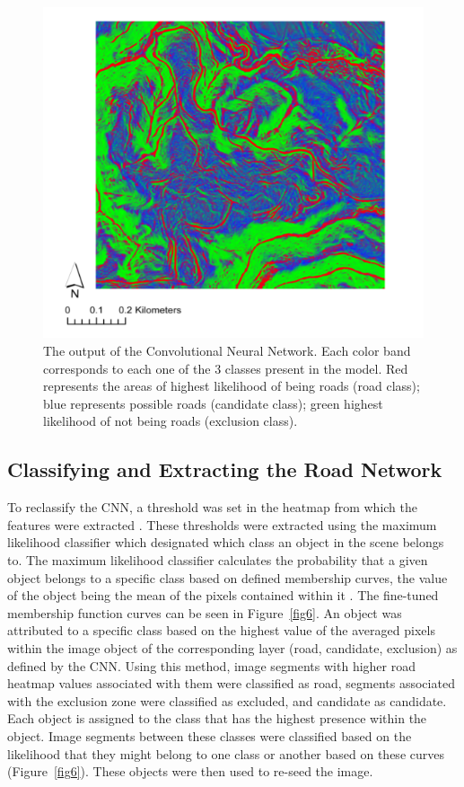 \documentclass[remotesensing,article,submit,pdftex,moreauthors]{Definitions/mdpi}
\begin{document}
\begin{figure}[H]
\includegraphics[width=10.5 cm]{cnn.png}
\caption{The output of the Convolutional Neural Network. Each color band corresponds to each one of the 3 classes present in the model. Red represents the areas of highest likelihood of being roads (road class); blue represents possible roads (candidate class); green highest likelihood of not being roads (exclusion class). \label{fig5}}
\end{figure}  

\subsection{Classifying and Extracting the Road Network}

To reclassify the CNN, a threshold was set in the heatmap from which the features were extracted \cite{luca, prakash, timilsina}. These thresholds were extracted using the maximum likelihood classifier which designated which class an object in the scene belongs to. The maximum likelihood classifier calculates the probability that a given object belongs to a specific class based on defined membership curves, the value of the object being the mean of the pixels contained within it \cite{richards}. The fine-tuned membership function curves can be seen in Figure~\ref{fig6}. An object was attributed to a specific class based on the highest value of the averaged pixels within the image object of the corresponding layer (road, candidate, exclusion) as defined by the CNN. Using this method, image segments with higher road heatmap values associated with them were classified as road, segments associated with the exclusion zone were classified as excluded, and candidate as candidate. Each object is assigned to the class that has the highest presence within the object. Image segments between these classes were classified based on the likelihood that they might belong to one class or another based on these curves (Figure~\ref{fig6}). These objects were then used to re-seed the image.
\end{document}
